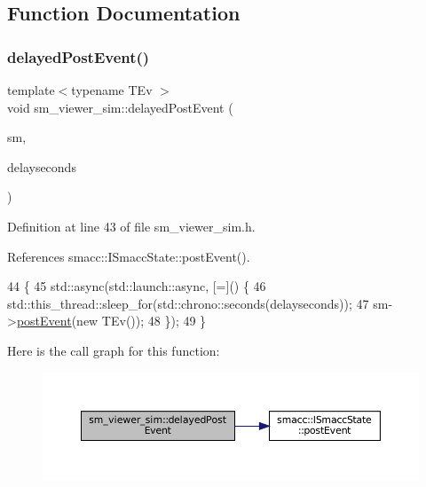 \subsection{Function Documentation}
\mbox{\label{namespacesm__viewer__sim_a19b5db17983d5b9bbf21e96ecf9ab5c8}} 
\subsubsection{\texorpdfstring{delayed\+Post\+Event()}{delayedPostEvent()}}
{\footnotesize\ttfamily template$<$typename T\+Ev $>$ \\
void sm\+\_\+viewer\+\_\+sim\+::delayed\+Post\+Event (\begin{DoxyParamCaption}\item[{\hyperlink{classsmacc_1_1ISmaccState}{smacc\+::\+I\+Smacc\+State} $\ast$}]{sm,  }\item[{int}]{delayseconds }\end{DoxyParamCaption})}



Definition at line 43 of file sm\+\_\+viewer\+\_\+sim.\+h.



References smacc\+::\+I\+Smacc\+State\+::post\+Event().


\begin{DoxyCode}
44 \{
45     std::async(std::launch::async, [=]() \{
46         std::this\_thread::sleep\_for(std::chrono::seconds(delayseconds));
47         sm->\hyperlink{classsmacc_1_1ISmaccState_acef404ab3766ddf2892e8dad14a4a7cf}{postEvent}(\textcolor{keyword}{new} TEv());
48     \});
49 \}
\end{DoxyCode}
Here is the call graph for this function\+:
\nopagebreak
\begin{figure}[H]
\begin{center}
\leavevmode
\includegraphics[width=350pt]{namespacesm__viewer__sim_a19b5db17983d5b9bbf21e96ecf9ab5c8_cgraph}
\end{center}
\end{figure}
